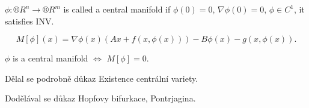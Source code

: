 \documentclass[12pt]{article}					%
\begin{document}
\begin{definice}
	$\phi: ®R^n \rightarrow ®R^m$ is called a central manifold if $\phi(0) = 0$, $\nabla \phi(0) = 0$, $\phi \in C^1$, it satisfies INV.
\end{definice}

\begin{definice}
	$$ M[\phi](x) = \nabla \phi(x) (A x + f(x, \phi(x))) - B \phi(x) - g(x, \phi(x)). $$
\end{definice}

\begin{dusledek}
	$\phi$ is a central manifold $\Leftrightarrow$ $M[\phi] = 0$.
\end{dusledek}


\begin{poznamka}
	Dělal se podrobně důkaz Existence centrální variety.
\end{poznamka}


\begin{poznamka}
	Dodělával se důkaz Hopfovy bifurkace, Pontrjagina.
\end{poznamka}
\end{document}
